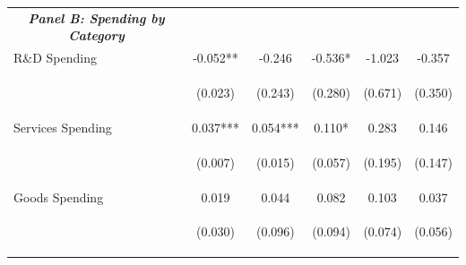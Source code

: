 \documentclass[dv_diss_main.tex]{subfiles}
\begin{document}
\begin{table}[H]
\begin{center}
{\begin{tabular}{lccccc}
    \multicolumn{1}{c}{\textit{\textbf{Panel B: Spending by Category}}} \\ 
    
    R\&D Spending & -0.052** & -0.246 & -0.536* & -1.023 & -0.357 \\
    \vspace{4pt} & \begin{footnotesize}(0.023)\end{footnotesize} & \begin{footnotesize}(0.243)\end{footnotesize} & \begin{footnotesize}(0.280)\end{footnotesize} & \begin{footnotesize}(0.671)\end{footnotesize} & \begin{footnotesize}(0.350)\end{footnotesize} \\
    Services Spending & 0.037*** & 0.054*** & 0.110* & 0.283 & 0.146 \\
    \vspace{4pt} & \begin{footnotesize}(0.007)\end{footnotesize} & \begin{footnotesize}(0.015)\end{footnotesize} & \begin{footnotesize}(0.057)\end{footnotesize} & \begin{footnotesize}(0.195)\end{footnotesize} & \begin{footnotesize}(0.147)\end{footnotesize} \\
    Goods Spending & 0.019 & 0.044 & 0.082 & 0.103 & 0.037 \\
     & \begin{footnotesize}(0.030)\end{footnotesize} & \begin{footnotesize}(0.096)\end{footnotesize} & \begin{footnotesize}(0.094)\end{footnotesize} & \begin{footnotesize}(0.074)\end{footnotesize} & \begin{footnotesize}(0.056)\end{footnotesize} \\


\end{tabular}}
\end{center}
\end{table}
\end{document}
